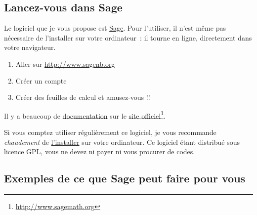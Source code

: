 \subsection{Lancez-vous dans Sage}

Le logiciel que je vous propose est \href{http://www.sagemath.org}{Sage}. Pour l'utiliser, il n'est même pas nécessaire de l'installer sur votre ordinateur~: il tourne en ligne, directement dans votre navigateur.

\begin{enumerate}

	\item
		Aller sur \href{http://www.sagenb.org}{http://www.sagenb.org}
	\item
		Créer un compte
	\item
		Créer des feuilles de calcul et amusez-vous !!

\end{enumerate}

Il y a beaucoup de \href{http://lmgtfy.com/?q=sage+documentation}{documentation} sur le \href{http://www.sagemath.org}{site officiel}\footnote{\href{http://www.sagemath.org}{http://www.sagemath.org}}.

Si vous comptez utiliser régulièrement ce logiciel, je vous recommande \emph{chaudement} de \href{http://mirror.switch.ch/mirror/sagemath/index.html}{l'installer} sur votre ordinateur. Ce logiciel étant distribué sous licence GPL, vous ne devez ni payer ni vous procurer de codes.

\subsection{Exemples de ce que Sage peut faire pour vous}

